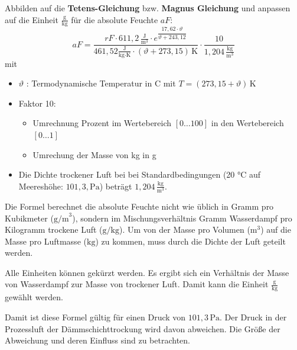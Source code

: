 Abbilden auf die  \textbf{Tetens-Gleichung} bzw. \textbf{Magnus Gleichung} und anpassen auf die Einheit $\frac{\text{g}}{\text{kg}}$ für die absolute Feuchte $aF$:
\begin{equation}
    aF
    = \frac{rF \cdot 611{,}2\, \frac{\text{J}}{\text{m}^3} \cdot e^{\dfrac{17{,}62 \cdot \vartheta}{\vartheta + 243{,}12}}}
    {461{,}52 \frac{\text{J}}{\text{kg} \cdot \text{K}} \cdot (\vartheta + 273{,}15)\, \text{K}}
    \cdot \frac{10}{1{,}204\, \frac{\text{kg}}{\text{m}^3}}
\end{equation}
mit 
\begin{itemize}
    \item $\vartheta$ : Termodynamische Temperatur in \textdegree C mit $T = (273{,}15 +  \vartheta)\, \text{K}$
    \item Faktor 10: 
    \begin{itemize}
        \item Umrechnung Prozent im Wertebereich $[0 \ldots 100]$ in den Wertebereich $[0 \ldots 1]$
        \item Umrechung der Masse von kg in g 
    \end{itemize}
    \item Die Dichte trockener Luft bei bei Standardbedingungen (20 °C auf Meereshöhe: $101{,}3, \text{Pa}$) beträgt $1,204\, \frac{\text{kg}}{\text{m}^3}$. 
\end{itemize}

Die Formel berechnet die absolute Feuchte nicht wie üblich in Gramm pro Kubikmeter ($\mathrm{g/m}^{\mathrm{3}}$), sondern im Mischungsverhältnis Gramm Wasserdampf pro Kilogramm trockene Luft ($\mathrm{g/kg}$). Um von der Masse pro Volumen ($\mathrm{m}^{\mathrm{3}}$) auf die Masse pro Luftmasse ($\mathrm{kg}$) zu kommen, muss durch die Dichte der Luft geteilt werden.

Alle Einheiten können gekürzt werden. Es ergibt sich ein Verhältnis der Masse von Wasserdampf zur Masse von trockener Luft. Damit kann die Einheit  $\frac{\text{g}}{\text{kg}}$ gewählt werden.

Damit ist diese Formel gültig für einen Druck von $101{,}3\, \text{Pa}$. Der Druck in der Prozessluft der Dämmschichttrockung wird davon abweichen. Die Größe der Abweichung und deren Einfluss sind zu betrachten.

